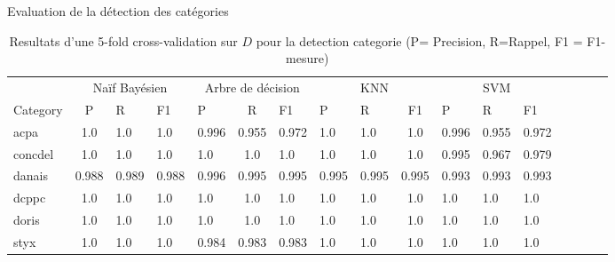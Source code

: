 \documentclass[newPxFont,pagenumber]{beamer}
\begin{document}
\begin{frame}{Evaluation de la détection des catégories}
\begin{table}
\tiny
\caption{Resultats d'une 5-fold cross-validation sur $D$ pour la detection categorie  (P= Precision, R=Rappel, F1 = F1-mesure)}\label{best_classif_score}
\begin{tabular}{l|c@{\hskip 0.1in}lllc@{\hskip 0.1in}lllc@{\hskip 0.1in}lllc@{\hskip 0.1in}lll}
\hline\noalign{\smallskip}
       &   \multicolumn{3}{c}{Naïf Bayésien}    &    \multicolumn{3}{c}{Arbre de décision}   &  \multicolumn{3}{c}{KNN}  & \multicolumn{3}{c}{SVM}     \\       
\noalign{\smallskip}
\hline
\noalign{\smallskip}
  Category      & P     & R     & F1    & P     & R     & F1    & P     & R     & F1    & P     & R     & F1    \\        
\noalign{\smallskip}
\hline
\noalign{\smallskip}
acpa    & 1.0 & 1.0 & 1.0 & 0.996 & 0.955 & 0.972 & 1.0 & 1.0 & 1.0 & 0.996 & 0.955 & 0.972 \\
concdel & 1.0 & 1.0 & 1.0 & 1.0 & 1.0 & 1.0 & 1.0 & 1.0 & 1.0 & 0.995 & 0.967 & 0.979 \\
danais  & 0.988 & 0.989 & 0.988 & 0.996 & 0.995 & 0.995 & 0.995 & 0.995 & 0.995 & 0.993 & 0.993 & 0.993 \\
dcppc   & 1.0 & 1.0 & 1.0 & 1.0 & 1.0 & 1.0 & 1.0 & 1.0 & 1.0 & 1.0 & 1.0 & 1.0 \\
doris   & 1.0 & 1.0 & 1.0 & 1.0 & 1.0 & 1.0 & 1.0 & 1.0 & 1.0 & 1.0 & 1.0 & 1.0 \\
styx    & 1.0 & 1.0 & 1.0 & 0.984 & 0.983 & 0.983 & 1.0 & 1.0 & 1.0 & 1.0 & 1.0 & 1.0 \\
\hline
\end{tabular}
\end{table}
\end{frame}
\end{document}
